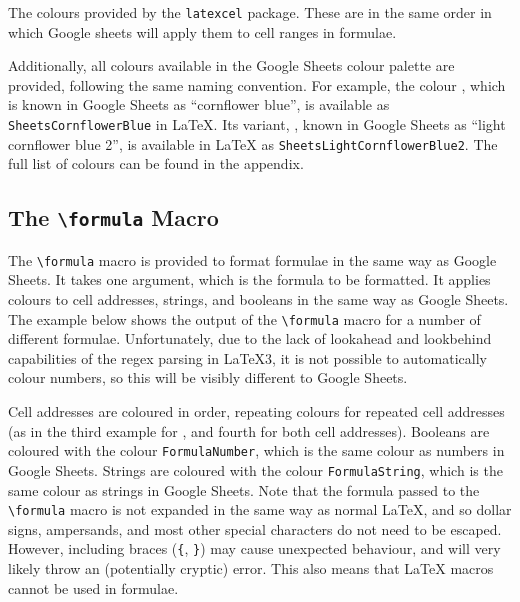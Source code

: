 \documentclass[table]{article}
\newcommand{\loadexampleleft}[1]{
    \qoinputlisting[mdframed options = {nobreak=true}]{examples/#1.tex}
    \begin{centeredbox}[before upper = {}]
        
    \end{centeredbox}
}
\newcommand{\cell}[2][FormulaOrange]{
    {\notomono\formula{#2}}
}
\begin{document}
\begin{table}[h!]
    \caption{The colours provided by the \texttt{latexcel} package. These are in the same order in which Google sheets will apply them to cell ranges in formulae.}
    \label{tab:colours}
\end{table}

Additionally, all colours available in the Google Sheets colour palette are provided, following the same naming convention. For example, the colour , which is known in Google Sheets as ``cornflower blue'', is available as \texttt{SheetsCornflowerBlue} in \LaTeX. Its variant, , known in Google Sheets as ``light cornflower blue 2'', is available in \LaTeX{} as \texttt{SheetsLightCornflowerBlue2}. The full list of colours can be found in the appendix.

\subsection{The \texttt{\textbackslash formula} Macro}

The \verb|\formula| macro is provided to format formulae in the same way as Google Sheets. It takes one argument, which is the formula to be formatted. It applies colours to cell addresses, strings, and booleans in the same way as Google Sheets. The example below shows the output of the \verb|\formula| macro for a number of different formulae. Unfortunately, due to the lack of lookahead and lookbehind capabilities of the regex parsing in \LaTeX3, it is not possible to automatically colour numbers, so this will be visibly different to Google Sheets.

\loadexampleleft{formula_colours}

Cell addresses are coloured in order, repeating colours for repeated cell addresses (as in the third example for \cell{A2}, and fourth for both cell addresses). Booleans are coloured with the colour \texttt{FormulaNumber}, which is the same colour as numbers in Google Sheets. Strings are coloured with the colour \texttt{FormulaString}, which is the same colour as strings in Google Sheets. Note that the formula passed to the \verb|\formula| macro is not expanded in the same way as normal \LaTeX{}, and so dollar signs, ampersands, and most other special characters do not need to be escaped. However, including braces (\texttt{\{}, \texttt{\}}) may cause unexpected behaviour, and will very likely throw an (potentially cryptic) error. This also means that \LaTeX{} macros cannot be used in formulae.
\end{document}
